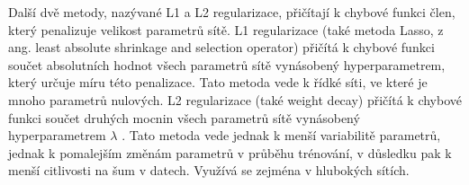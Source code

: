 Další dvě metody, nazývané L1 a L2 regularizace, přičítají k chybové funkci
člen, který penalizuje velikost parametrů sítě. L1 regularizace (také metoda Lasso, z ang. least absolute shrinkage and selection operator) 
\cite{lasso} přičítá k
chybové funkci součet absolutních hodnot všech parametrů sítě vynásobený
hyperparametrem, který určuje míru této penalizace. Tato metoda vede k řídké
síti, ve které je mnoho parametrů nulových. L2 regularizace (také weight decay)
přičítá k chybové funkci součet druhých mocnin všech parametrů sítě vynásobený
hyperparametrem $\lambda$ \cite{l2}. Tato metoda vede jednak k menší
variabilitě parametrů, jednak k pomalejším změnám parametrů v průběhu  
trénování, v důsledku pak k menší citlivosti na šum v datech. Využívá se
zejména v hlubokých sítích.

\endinput